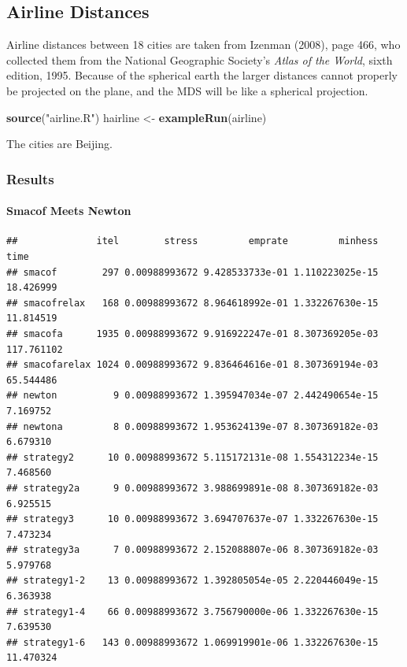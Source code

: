 \documentclass[
  12pt,
]{article}
\newenvironment{Shaded}{\begin{snugshade}}{\end{snugshade}}
\newcommand{\FunctionTok}[1]{\textcolor[rgb]{0.13,0.29,0.53}{\textbf{#1}}}
\newcommand{\NormalTok}[1]{#1}
\newcommand{\OtherTok}[1]{\textcolor[rgb]{0.56,0.35,0.01}{#1}}
\newcommand{\StringTok}[1]{\textcolor[rgb]{0.31,0.60,0.02}{#1}}
\begin{document}
\subsection{Airline Distances}\label{airline-distances}

Airline distances between 18 cities are taken from Izenman (2008), page 466, who collected them from the National Geographic Society's \emph{Atlas of the World}, sixth edition, 1995. Because of the spherical earth the larger distances cannot properly be
projected on the plane, and the MDS will be like a spherical projection.

\begin{Shaded}
\begin{Highlighting}[]
\FunctionTok{source}\NormalTok{(}\StringTok{"airline.R"}\NormalTok{)}
\NormalTok{hairline }\OtherTok{\textless{}{-}} \FunctionTok{exampleRun}\NormalTok{(airline)}
\end{Highlighting}
\end{Shaded}

The cities are Beijing.

\subsubsection{Results}\label{results-7}

\paragraph{Smacof Meets Newton}\label{smacof-meets-newton-7}

\begin{verbatim}
##              itel        stress         emprate         minhess       time
## smacof        297 0.00988993672 9.428533733e-01 1.110223025e-15  18.426999
## smacofrelax   168 0.00988993672 8.964618992e-01 1.332267630e-15  11.814519
## smacofa      1935 0.00988993672 9.916922247e-01 8.307369205e-03 117.761102
## smacofarelax 1024 0.00988993672 9.836464616e-01 8.307369194e-03  65.544486
## newton          9 0.00988993672 1.395947034e-07 2.442490654e-15   7.169752
## newtona         8 0.00988993672 1.953624139e-07 8.307369182e-03   6.679310
## strategy2      10 0.00988993672 5.115172131e-08 1.554312234e-15   7.468560
## strategy2a      9 0.00988993672 3.988699891e-08 8.307369182e-03   6.925515
## strategy3      10 0.00988993672 3.694707637e-07 1.332267630e-15   7.473234
## strategy3a      7 0.00988993672 2.152088807e-06 8.307369182e-03   5.979768
## strategy1-2    13 0.00988993672 1.392805054e-05 2.220446049e-15   6.363938
## strategy1-4    66 0.00988993672 3.756790000e-06 1.332267630e-15   7.639530
## strategy1-6   143 0.00988993672 1.069919901e-06 1.332267630e-15  11.470324
\end{verbatim}
\end{document}
